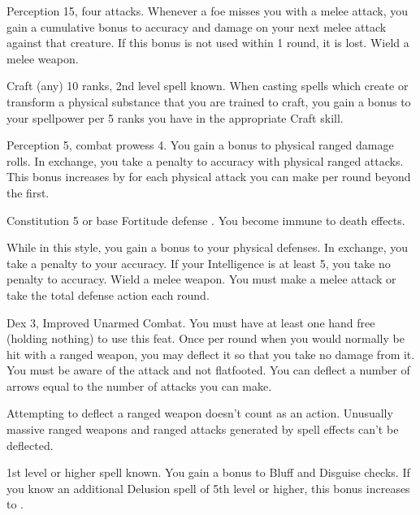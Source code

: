 \featpres Perception 15, four attacks.
\featben Whenever a foe misses you with a melee attack, you gain a cumulative  bonus to accuracy and damage on your next melee attack against that creature.
If this bonus is not used within 1 round, it is lost.
\stylereq Wield a melee weapon.

\featpres Craft (any) 10 ranks, 2nd level spell known.
\featben When casting spells which create or transform a physical substance that you are trained to craft, you gain a  bonus to your spellpower per 5 ranks you have in the appropriate Craft skill.

\featpres Perception 5, combat prowess 4.
\featben You gain a  bonus to physical ranged damage rolls.
In exchange, you take a  penalty to accuracy with physical ranged attacks.
This bonus increases by  for each physical attack you can make per round beyond the first.

\featpre Constitution 5 or base Fortitude defense .
\featben You become immune to death effects.

\featben While in this style, you gain a  bonus to your physical defenses.
In exchange, you take a  penalty to your accuracy.
If your Intelligence is at least 5, you take no penalty to accuracy.
\stylereq Wield a melee weapon. You must make a melee attack or take the total defense action each round.

\featpres Dex 3, Improved Unarmed Combat.
\featben You must have at least one hand free (holding nothing) to use this feat.
Once per round when you would normally be hit with a ranged weapon, you may deflect it so that you take no damage from it.
You must be aware of the attack and not flatfooted.
You can deflect a number of arrows equal to the number of attacks you can make.
\par Attempting to deflect a ranged weapon doesn't count as an action.
Unusually massive ranged weapons and ranged attacks generated by spell effects can't be deflected.

\featpre 1st level or higher  spell known.
\featben You gain a  bonus to Bluff and Disguise checks.
If you know an additional Delusion spell of 5th level or higher, this bonus increases to .

